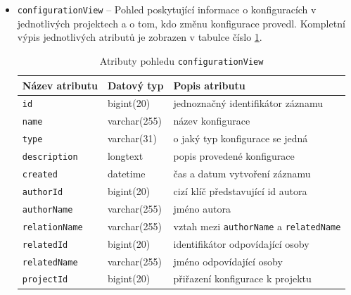 \documentclass[czech,DP]{thesiskiv}
\begin{document}
\begin{itemize}
    \item \texttt{configurationView} -- Pohled poskytující informace o konfiguracích v jednotlivých projektech a o tom, kdo změnu konfigurace provedl. Kompletní výpis jednotlivých atributů je zobrazen v tabulce číslo \ref{tab:configurationview}.
    \begin{table}[]
        \begin{tabular}{|l|l|l|}
        \hline
        \textbf{Název atributu} & \textbf{Datový typ} & \textbf{Popis atributu}           \\ \hline \hline
        \texttt{id}             & bigint(20)          & jednoznačný identifikátor záznamu \\ \hline
        \texttt{name}           & varchar(255)        & název konfigurace                              \\ \hline
        \texttt{type}           & varchar(31)         & o jaký typ konfigurace se jedná                         \\ \hline
        \texttt{description}    & longtext            & popis provedené konfigurace                              \\ \hline
        \texttt{created}        & datetime            & čas a datum vytvoření záznamu                              \\ \hline
        \texttt{authorId}       & bigint(20)          & cizí klíč představující id autora                              \\ \hline
        \texttt{authorName}     & varchar(255)        & jméno autora                              \\ \hline
        \texttt{relationName}   & varchar(255)        & vztah mezi \texttt{authorName} a \texttt{relatedName}                              \\ \hline
        \texttt{relatedId}      & bigint(20)          & identifikátor odpovídající osoby                              \\ \hline
        \texttt{relatedName}    & varchar(255)        & jméno odpovídající osoby                              \\ \hline
        \texttt{projectId}      & bigint(20)          & přiřazení konfigurace k projektu                              \\ \hline
        \end{tabular}
        \caption{\label{tab:configurationview}Atributy pohledu \texttt{configurationView}}
    \end{table}


\end{itemize}
\end{document}
